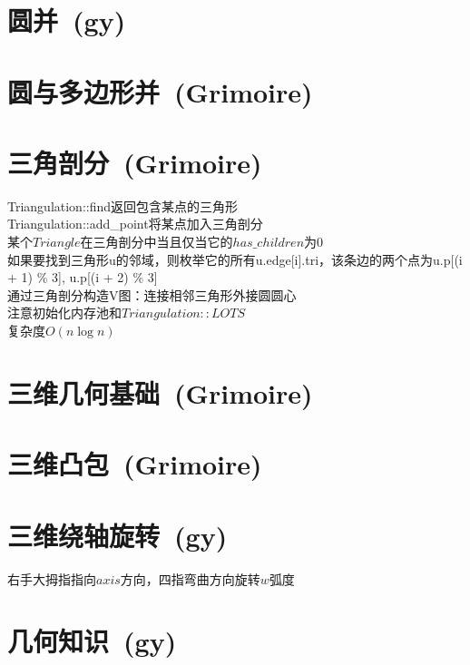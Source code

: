 \section{圆并\ \small(gy)}

\section{圆与多边形并\ \small(Grimoire)}

\section{三角剖分\ \small(Grimoire)}
    \noindent Triangulation::find返回包含某点的三角形
    \\Triangulation::add\_point将某点加入三角剖分
    \\某个$ Triangle $在三角剖分中当且仅当它的$ has\_children $为$ 0 $
    \\如果要找到三角形u的邻域，则枚举它的所有u.edge[i].tri，该条边的两个点为u.p[(i + 1) \% 3], u.p[(i + 2) \% 3]
    \\通过三角剖分构造V图：连接相邻三角形外接圆圆心
    \\注意初始化内存池和$ Triangulation::LOTS $
    \\复杂度$ O(n \log n) $

\section{三维几何基础\ \small(Grimoire)}

\section{三维凸包\ \small(Grimoire)}

\section{三维绕轴旋转\ \small(gy)}
    右手大拇指指向$ axis $方向，四指弯曲方向旋转$ w $弧度

\section{几何知识\ \small(gy)}
    
